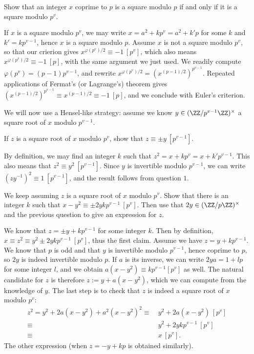 \documentclass[11pt]{exam}
\theoremstyle{definition}
\begin{document}
{\begin{questions}
  \question Show that an integer $x$ coprime to $p$ is a square modulo $p$ if and only if it is a square modulo $p^v$.
  
  \begin{solution}
    If $x$ is a square modulo $p^v$, we may write $x=a^2+kp^v=a^2+k'p$ for some $k$ and $k'=kp^{v-1}$, hence $x$ is a square modulo $p$. Assume $x$ is not a square modulo $p^v$, so that our crierion gives $x^{\varphi(p^v)/2}\equiv -1~[p^v]$, which also means $x^{\varphi(p^v)/2}\equiv -1~[p]$, with the same argument we just used. We readily compute $\varphi(p^v)=(p-1)p^{v-1}$, and rewrite $x^{\varphi(p^v)/2} = (x^{(p-1)/2})^{p^{v-1}}$. Repeated applications of Fermat's (or Lagrange's) theorem gives $(x^{(p-1)/2})^{p^{v-1}} \equiv x^{(p-1)/2} \equiv -1~[p]$, and we conclude with Euler's criterion.

  \end{solution}

  We will now use a Hensel-like strategy: assume we know $y \in (\ZZ/p^{v-1}\ZZ)^\times$ a square root of $x$ modulo $p^{v-1}$.

  \question  If $z$ is a square root of $x$ modulo $p^{v}$, show that $z\equiv \pm y~[p^{v-1}]$.

  \begin{solution}
    By definition, we may find an integer $k$ such that $z^2 = x+kp^v = x+k'p^{v-1}$. This also means that $z^2 \equiv y^2~[p^{v-1}]$. Since $y$ is invertible modulo $p^{v-1}$, we can write $(zy^{-1})^2 \equiv 1~[p^{v-1}]$, and the result follows from question $1$.

  \end{solution}

  \question We keep assuming $z$ is a square root of $x$ modulo $p^v$. Show that there is an integer $k$ such that $x-y^2 \equiv \pm 2ykp^{v-1}~[p^{v}]$. Then use that $2y \in (\ZZ/p\ZZ)^\times$ and the previous question to give an expression for $z$.

  \begin{solution}
    We know that $z=\pm y+kp^{v-1}$ for some integer $k$. Then by definition, $x \equiv z^2 \equiv y^2\pm 2ykp^{v-1}~[p^v]$, thus the first claim. Assume we have $z=y+kp^{v-1}$. We know that $p$ is odd and that $y$ is invertible modulo $p^{v-1}$, hence coprime to $p$, so $2y$ is indeed invertible modulo $p$. If $a$ is its inverse, we can write $2ya = 1 +lp$ for some integer $l$, and we obtain $a(x-y^2) \equiv kp^{v-1} [p^v]$ as well. The natural candidate for $z$ is therefore $z:=y+a(x-y^2)$, which we can compute from the knowledge of $y$. The last step is to check that $z$ is indeed a square root of $x$ modulo $p^v$:
    \begin{align*}z^2 = y^2+2a(x-y^2)+a^2(x-y^2)^2 \equiv&~y^2 +2a(x-y^2)~[p^v]\\
      \equiv&~y^2 + 2ykp^{v-1}~[p^v]\\
      \equiv&~x~[p^v].
    \end{align*}
    The other expression (when $z=-y+kp$ is obtained similarly).
    

\end{solution}
\end{questions}}
\end{document}
